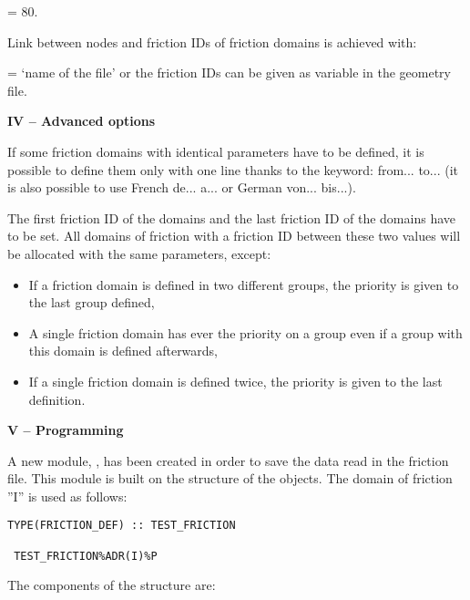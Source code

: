  = 80.

Link between nodes and friction IDs of friction domains is achieved with:

 = `name of the file'
or \newline
the friction IDs can be given as variable
 in the geometry file.

\textbf{IV -- Advanced options}

If some friction domains with identical parameters have to be defined,
it is possible to define them only with one line thanks to the keyword:
from... to... (it is also possible to use French de... a...
or German von... bis...).

The first friction ID of the domains and the last friction ID of the domains
have to be set.
All domains of friction with a friction ID between these two values will be
allocated with the same parameters, except:
\begin{itemize}
\item If a friction domain is defined in two different groups,
the priority is given to the last group defined,

\item A single friction domain has ever the priority on a group even
if a group with this domain is defined afterwards,

\item If a single friction domain is defined twice, the priority is given to the
last definition.
\end{itemize}

\textbf{V -- Programming}

A new module, , has been created in order to save the
data read in the friction file.
This module is built on the structure of the  objects.
The domain of friction ''I'' is used as follows:
\begin{lstlisting}[language=TelFortran]
 TYPE(FRICTION_DEF) :: TEST_FRICTION

 TEST_FRICTION%ADR(I)%P
\end{lstlisting}
 The components of the structure are:



\begin{tabular}{|p{}|p{2.5in}|} \hline
\end{tabular}


